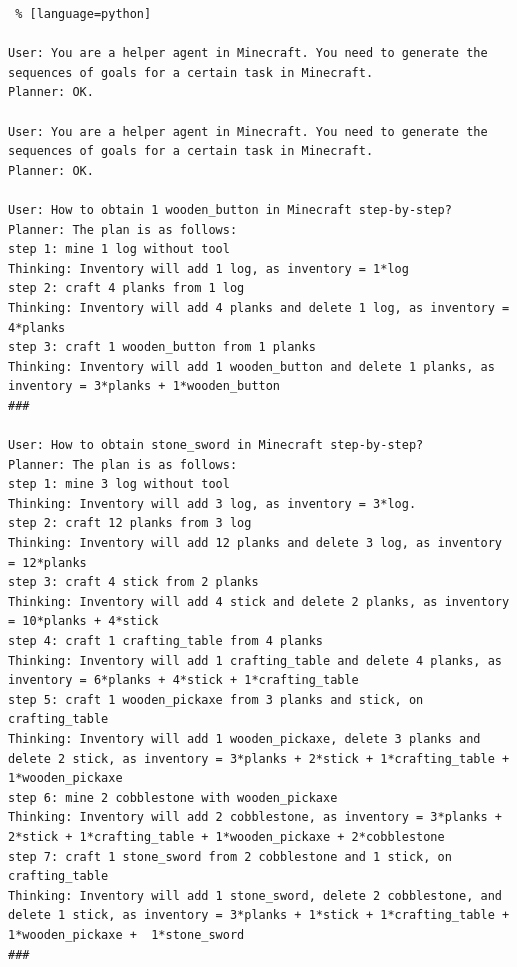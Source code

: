 \begin{lstlisting} % [language=python]  

User: You are a helper agent in Minecraft. You need to generate the sequences of goals for a certain task in Minecraft.
Planner: OK.

User: You are a helper agent in Minecraft. You need to generate the sequences of goals for a certain task in Minecraft.
Planner: OK.

User: How to obtain 1 wooden_button in Minecraft step-by-step?
Planner: The plan is as follows:
step 1: mine 1 log without tool
Thinking: Inventory will add 1 log, as inventory = 1*log
step 2: craft 4 planks from 1 log
Thinking: Inventory will add 4 planks and delete 1 log, as inventory = 4*planks
step 3: craft 1 wooden_button from 1 planks
Thinking: Inventory will add 1 wooden_button and delete 1 planks, as inventory = 3*planks + 1*wooden_button
###

User: How to obtain stone_sword in Minecraft step-by-step?
Planner: The plan is as follows:
step 1: mine 3 log without tool 
Thinking: Inventory will add 3 log, as inventory = 3*log.
step 2: craft 12 planks from 3 log
Thinking: Inventory will add 12 planks and delete 3 log, as inventory = 12*planks
step 3: craft 4 stick from 2 planks 
Thinking: Inventory will add 4 stick and delete 2 planks, as inventory = 10*planks + 4*stick
step 4: craft 1 crafting_table from 4 planks 
Thinking: Inventory will add 1 crafting_table and delete 4 planks, as inventory = 6*planks + 4*stick + 1*crafting_table
step 5: craft 1 wooden_pickaxe from 3 planks and stick, on crafting_table
Thinking: Inventory will add 1 wooden_pickaxe, delete 3 planks and delete 2 stick, as inventory = 3*planks + 2*stick + 1*crafting_table + 1*wooden_pickaxe
step 6: mine 2 cobblestone with wooden_pickaxe
Thinking: Inventory will add 2 cobblestone, as inventory = 3*planks + 2*stick + 1*crafting_table + 1*wooden_pickaxe + 2*cobblestone
step 7: craft 1 stone_sword from 2 cobblestone and 1 stick, on crafting_table
Thinking: Inventory will add 1 stone_sword, delete 2 cobblestone, and delete 1 stick, as inventory = 3*planks + 1*stick + 1*crafting_table + 1*wooden_pickaxe +  1*stone_sword
###

\end{lstlisting}


